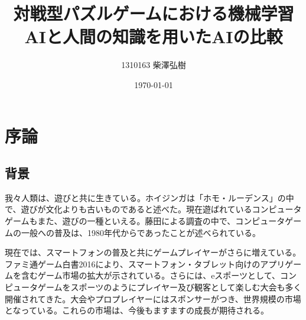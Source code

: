 \documentclass[12pt]{jreport}
\title{対戦型パズルゲームにおける機械学習AIと人間の知識を用いたAIの比較}
\date{\today}
\author{1310163 柴澤弘樹}
\begin{document}
\tableofcontents

\chapter{序論} \label{zyo} \setcounter{section}{0}
\section{背景}
我々人類は、遊びと共に生きている。ホイジンガは「ホモ・ルーデンス」の中で、遊びが文化よりも古いものであると述べた\cite{homo}。現在遊ばれているコンピュータゲームもまた、遊びの一種といえる。藤田による調査\cite{huzita1,huzita2,huzita3}の中で、コンピュータゲームの一般への普及は、1980年代からであったことが述べられている。

現在では、スマートフォンの普及と共にゲームプレイヤーがさらに増えている。ファミ通ゲーム白書2016\cite{famitu}により、スマートフォン・タブレット向けのアプリゲームを含むゲーム市場の拡大が示されている。さらには、eスポーツとして、コンピュータゲームをスポーツのようにプレイヤー及び観客として楽しむ大会も多く開催されてきた。大会やプロプレイヤーにはスポンサーがつき、世界規模の市場となっている\cite{e-sports}。これらの市場は、今後もますますの成長が期待される。



\end{document}
